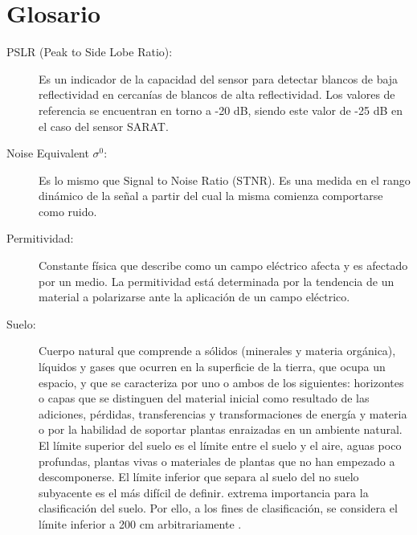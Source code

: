 \chapter{Glosario}
\label{ch:glosario}
\begin{description}

\item [PSLR (Peak to Side Lobe Ratio):] Es un indicador de la capacidad del sensor para detectar blancos de baja reflectividad en cercanías de blancos de alta reflectividad. Los valores de referencia se encuentran en torno a -20 dB, siendo este valor de -25 dB en el caso del sensor SARAT.

\item [Noise Equivalent $\sigma^0$:] Es lo mismo que Signal to Noise Ratio (STNR). Es una medida en el rango dinámico de la señal a partir del cual la misma comienza comportarse como ruido.
\item [Permitividad:] Constante física que describe como un campo eléctrico afecta y es afectado por un medio. La permitividad está determinada por la tendencia de un material a polarizarse ante la aplicación de un campo eléctrico. 
\item [Suelo:] Cuerpo natural que comprende a sólidos (minerales y materia orgánica), líquidos y gases que ocurren en la superficie de la tierra, que ocupa un espacio, y que se caracteriza por uno o ambos de los siguientes: horizontes o capas que se distinguen del material inicial como resultado de las adiciones, pérdidas, transferencias y transformaciones de energía y materia o por la habilidad de soportar plantas enraizadas en un ambiente natural. El límite superior del suelo es el límite entre el suelo y el aire, aguas poco profundas, plantas vivas o materiales de plantas que no han empezado a descomponerse. El límite inferior que separa al suelo del no suelo subyacente es el más difícil de definir. extrema importancia para la clasificación del suelo. Por ello, a los fines de clasificación, se considera el límite inferior a 200 cm arbitrariamente \citep{usda2006}. 





\end{description}
